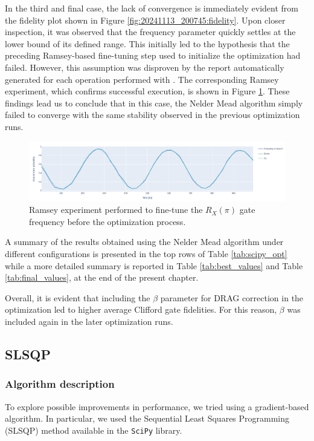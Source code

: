In the third and final case, the lack of convergence is immediately evident from the fidelity plot shown in Figure \ref{fig:20241113_200745:fidelity}.
Upon closer inspection, it was observed that the frequency parameter quickly settles at the lower bound of its defined range. 
This initially led to the hypothesis that the preceding Ramsey-based fine-tuning step used to initialize the optimization had failed.
However, this assumption was disproven by the report automatically generated for each operation performed with \Qibocal.
The corresponding Ramsey experiment, which confirms successful execution, is shown in Figure \ref{fig:Ramsey_NM}.
These findings lead us to conclude that in this case, the Nelder Mead algorithm simply failed to converge with the same stability observed in the previous optimization runs.

\begin{figure}[h!]
    \centering
    \includegraphics[width=\textwidth]{figures/png/RB_optimization/NM/InitialSymplex/20241113_200745/Ramsey.png}
    \caption{Ramsey experiment performed to fine-tune the $R_X(\pi)$ gate frequency before the optimization process.}
    \label{fig:Ramsey_NM}
\end{figure}

A summary of the results obtained using the Nelder Mead algorithm under different configurations is presented in the top rows of Table \ref{tab:scipy_opt} while a more detailed summary is reported in Table \ref{tab:best_values} and Table \ref{tab:final_values}, at the end of the present chapter.

Overall, it is evident that including the $\beta$ parameter for DRAG correction in the optimization led to higher average Clifford gate fidelities.
For this reason, $\beta$ was included again in the later optimization runs.

\subsection{SLSQP}
\subsubsection{Algorithm description}
To explore possible improvements in performance, we tried using a gradient-based algorithm. 
In particular, we used the Sequential Least Squares Programming (SLSQP) method available in the \texttt{SciPy} library.

